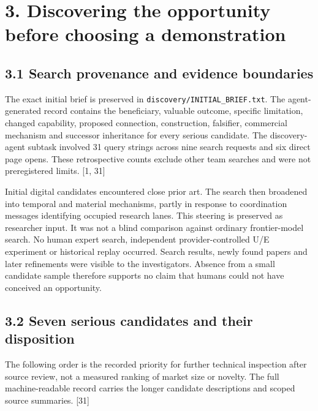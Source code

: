 \documentclass[
  11pt,
]{article}
\begin{document}
\hypertarget{discovering-the-opportunity-before-choosing-a-demonstration}{%
\section{3. Discovering the opportunity before choosing a
demonstration}\label{discovering-the-opportunity-before-choosing-a-demonstration}}

\hypertarget{search-provenance-and-evidence-boundaries}{%
\subsection{3.1 Search provenance and evidence
boundaries}\label{search-provenance-and-evidence-boundaries}}

The exact initial brief is preserved in
\nolinkurl{discovery/INITIAL_BRIEF.txt}. The agent-generated record
contains the beneficiary, valuable outcome, specific limitation, changed
capability, proposed connection, construction, falsifier, commercial
mechanism and successor inheritance for every serious candidate. The
discovery-agent subtask involved 31 query strings across nine search
requests and six direct page opens. These retrospective counts exclude
other team searches and were not preregistered limits. {[}1, 31{]}

Initial digital candidates encountered close prior art. The search then
broadened into temporal and material mechanisms, partly in response to
coordination messages identifying occupied research lanes. This steering
is preserved as researcher input. It was not a blind comparison against
ordinary frontier-model search. No human expert search, independent
provider-controlled U/E experiment or historical replay occurred. Search
results, newly found papers and later refinements were visible to the
investigators. Absence from a small candidate sample therefore supports
no claim that humans could not have conceived an opportunity.

\hypertarget{seven-serious-candidates-and-their-disposition}{%
\subsection{3.2 Seven serious candidates and their
disposition}\label{seven-serious-candidates-and-their-disposition}}

The following order is the recorded priority for further technical
inspection after source review, not a measured ranking of market size or
novelty. The full machine-readable record carries the longer candidate
descriptions and scoped source summaries. {[}31{]}
\end{document}
